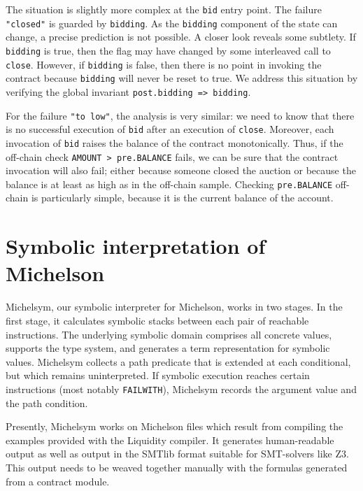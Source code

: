 \documentclass[a4paper,USenglish,american,cleveref, autoref, thm-restate]{oasics-v2021}
\begin{document}
The situation is slightly more complex at the \lstinline/bid/
entry point. The failure \lstinline/"closed"/ is guarded by
\lstinline/bidding/. As the \lstinline/bidding/ component of the state can change,
a precise prediction is not possible. A closer look reveals some
subtlety. If \lstinline/bidding/ is true, then the flag may have
changed by some interleaved call to \lstinline/close/. However, if
\lstinline/bidding/ is false, then there is no point in invoking the
contract because \lstinline/bidding/ will never be reset to true.
We address this situation by verifying the global invariant
\lstinline/post.bidding => bidding/. 

For the failure \lstinline/"to low"/, the analysis is very similar:
we need to know that there is no successful execution of
\lstinline/bid/ after an execution of \lstinline/close/. Moreover,
each invocation of \lstinline/bid/ raises the balance of the contract
monotonically. Thus, if the off-chain check
\lstinline/AMOUNT > pre.BALANCE/ fails, we can be sure that the contract
invocation will also fail; either because someone closed the auction or
because the balance is at least as high as in the off-chain sample. Checking \lstinline/pre.BALANCE/
off-chain is particularly simple, because it is the current balance of the account.

\section{Symbolic interpretation of Michelson}
\label{sec:symb-interpr-mich}

Michelsym, our symbolic interpreter for Michelson, works in two stages. In the first stage, it
calculates symbolic stacks between each pair of reachable instructions. The underlying symbolic
domain comprises all concrete values, supports the type system, and generates a term representation
for symbolic values. Michelsym collects a path predicate that is extended at each conditional, but
which remains uninterpreted. If symbolic execution reaches certain instructions (most notably
\lstinline/FAILWITH/), Michelsym records the argument value and the path condition. 

Presently, Michelsym works on Michelson files which result from compiling the examples
provided with the Liquidity compiler. It generates human-readable output as well as output in the
SMTlib format suitable for SMT-solvers like Z3. This output needs to be weaved together manually
with the formulas generated from a contract module.
\end{document}
